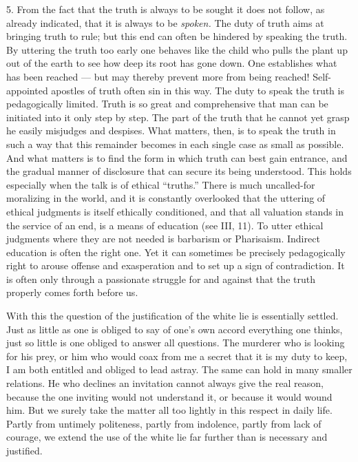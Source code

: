 \documentclass[12pt,a4paper,openany]{book}
\newcommand{\opage}[1]{\marginnote{\footnotesize\textit{[#1]}}}
\begin{document}
5. From the fact that the truth is always to be sought it does not follow, as already indicated, that it is always to
be \textit{spoken.} The duty of truth aims at bringing truth to rule; but this end can often be hindered by speaking the
truth. By uttering the truth too early one behaves like the child who pulls the plant up out of the earth to see how
deep its root has gone down. One establishes what has been reached --- but may thereby prevent more from being reached!
Self-appointed apostles of truth often sin in this way. The duty to speak the truth is pedagogically limited. Truth is
so great and comprehensive that man can be initiated into it only step by step. The part of the truth that he cannot
yet grasp he easily misjudges and despises. What matters, then, is to speak the truth in such a way that this remainder
becomes in each single case as small as possible. And what matters is to find the form in which truth can best gain
entrance, and the gradual manner of disclosure that can secure its being understood. This holds especially when the
talk is of ethical ``truths.'' There is much uncalled-for moralizing in the world, and it is constantly overlooked that
the uttering of ethical judgments is itself ethically conditioned, and that all valuation stands in the service of an
end, is a means of education (see III, 11). To utter ethical judgments where they are not needed is barbarism or
Pharisaism. Indirect education is often the right one. Yet it can sometimes be precisely pedagogically right to arouse
offense and exasperation and to set up a sign of contradiction. %
It is often only through a passionate struggle for and against that the truth properly comes forth before us.

\opage{258}With this the question of the justification of the white lie %
is essentially settled. Just as little as one is obliged to say of one's own accord everything one thinks, just so
little is one obliged to answer all questions. The murderer who is looking for his prey, or him who would coax from me
a secret that it is my duty to keep, I am both entitled and obliged to lead astray. The same can hold in many smaller
relations. He who declines an invitation cannot always give the real reason, because the one inviting would not
understand it, or because it would wound him. But we surely take the matter all too lightly in this respect in daily
life. Partly from untimely politeness, partly from indolence, partly from lack of courage, we extend the use of the
white lie far further than is necessary and justified.
\end{document}
